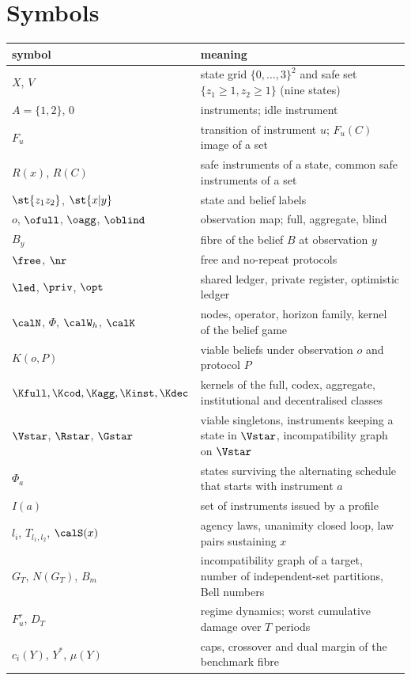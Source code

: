\section{Symbols}\label{si:symbols}

\begin{table}[H]
\centering\small
\begin{tabular}{@{}lp{}@{}}
\toprule
symbol & meaning \\
\midrule
$X$, $V$ & state grid $\{0,\dots,3\}^2$ and safe set $\{z_1\ge 1, z_2\ge 1\}$ (nine states) \\
$A=\{1,2\}$, $0$ & instruments; idle instrument \\
$F_u$ & transition of instrument $u$; $F_u(C)$ image of a set \\
$R(x)$, $R(C)$ & safe instruments of a state, common safe instruments of a set \\
$\st{z_1z_2}$, $\st{x|y}$ & state and belief labels \\
$o$, $\ofull$, $\oagg$, $\oblind$ & observation map; full, aggregate, blind \\
$B_y$ & fibre of the belief $B$ at observation $y$ \\
$\free$, $\nr$ & free and no-repeat protocols \\
$\led$, $\priv$, $\opt$ & shared ledger, private register, optimistic ledger \\
$\calN$, $\Phi$, $\calW_h$, $\calK$ & nodes, operator, horizon family, kernel of the belief game \\
$K(o,P)$ & viable beliefs under observation $o$ and protocol $P$ \\
$\Kfull,\Kcod,\Kagg,\Kinst,\Kdec$ & kernels of the full, codex, aggregate, institutional and decentralised classes \\
$\Vstar$, $\Rstar$, $\Gstar$ & viable singletons, instruments keeping a state in $\Vstar$, incompatibility graph on $\Vstar$ \\
$\Phi_a$ & states surviving the alternating schedule that starts with instrument $a$ \\
$I(a)$ & set of instruments issued by a profile \\
$l_i$, $T_{l_1,l_2}$, $\calS(x)$ & agency laws, unanimity closed loop, law pairs sustaining $x$ \\
$G_T$, $N(G_T)$, $B_m$ & incompatibility graph of a target, number of independent-set partitions, Bell numbers \\
$F^{r}_u$, $D_T$ & regime dynamics; worst cumulative damage over $T$ periods \\
$c_i(Y)$, $Y^{\ast}$, $\mu(Y)$ & caps, crossover and dual margin of the benchmark fibre \\
\bottomrule
\end{tabular}
\end{table}


